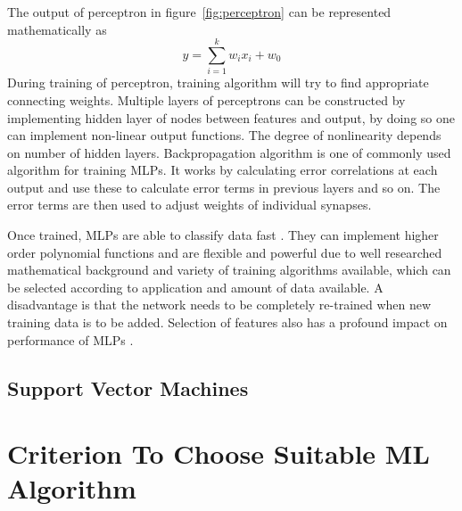 The output of perceptron in figure~\ref{fig:perceptron} can be represented mathematically as
\[ y = \sum\limits_{i=1}^k w_ix_i + w_0 \]
During training of perceptron, training algorithm will try to find appropriate connecting weights. Multiple layers of perceptrons can be constructed by implementing hidden layer of nodes between features and output, by doing so one can implement non-linear output functions. The degree of nonlinearity depends on number of hidden layers. Backpropagation algorithm \cite{Rumelhart1985} is one of commonly used algorithm for training MLPs. It works by calculating error correlations at each output and use these to calculate error terms in previous layers and so on. The error terms are then used to adjust weights of individual synapses.

Once trained, MLPs are able to classify data fast \cite{Alpaydin2004}. They can implement higher order polynomial functions and are flexible and powerful due to well researched mathematical background and variety of training algorithms available, which can be selected according to application and amount of data available. A disadvantage is that the network needs to be completely re-trained when new training data is to be added. Selection of features also has a profound impact on performance of MLPs \cite{Kavzoglu2002, El-Khatib2010}.

\subsection{Support Vector Machines}

\section{Criterion To Choose Suitable ML Algorithm}
\label{sec:c3mlselection}
